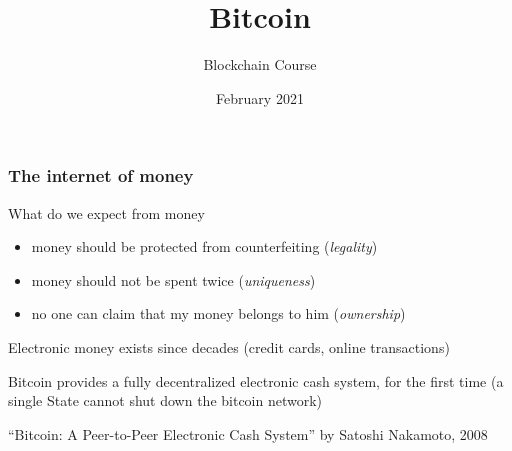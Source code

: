\documentclass[11pt]{beamer}  %
\subtitle{Blockchain Course}
\title{Bitcoin}
\institute{Universit\`a di Verona, Italy}
\date{February 2021}
\begin{document}
\begin{frame}
  \titlepage
\end{frame}

\begin{frame}
  \frametitle{The internet of money}

  \begin{greenbox}{What do we expect from money}
    \begin{itemize}
    \item money should be protected from counterfeiting (\emph{legality})
    \item money should not be spent twice (\emph{uniqueness})
    \item no one can claim that my money belongs to him (\emph{ownership})
    \end{itemize}
  \end{greenbox}

  \bigskip

  Electronic money exists since decades (credit cards, online transactions)

  \bigskip

  \begin{greenbox}{}
    Bitcoin provides a \alert{fully decentralized} electronic cash system, for the first time
    (a single State cannot shut down the bitcoin network)
  \end{greenbox}

  \bigskip

  ``Bitcoin: A Peer-to-Peer Electronic Cash System'' by Satoshi Nakamoto, 2008

\end{frame}
\end{document}
